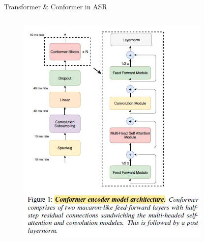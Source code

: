 \begin{frame}{Transformer \& Conformer in ASR}
\begin{columns}
\begin{column}{0.45\textwidth}
\begin{figure}[h]
                \includegraphics[width=\textwidth,height=0.9\textheight,keepaspectratio]{images/audio-nlp/transformer_conformer_overview.png}
            \end{figure}
        \end{column}
    \end{columns}
\end{frame}


